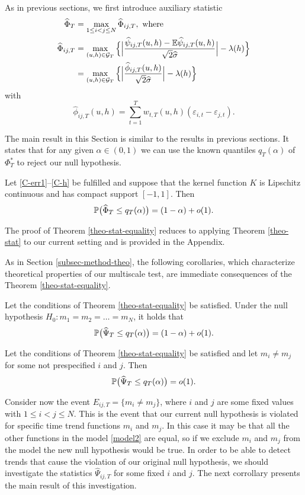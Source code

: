 \documentclass[a4paper,12pt]{article}
\numberwithin{equation}{section}
\begin{document}
As in previous sections, we first introduce auxiliary statistic 
\begin{align*}
\widehat{\Phi}_T &= \max_{1\le i < j \le N} \widehat{\Phi}_{ij, T}, \text{ where}\\
\widehat{\Phi}_{ij,T} 
 & = \max_{(u,h) \in \mathcal{G}_T} \Big\{ \Big| \frac{\widehat{\psi}_{ij,T}(u,h) - \mathbb{E} \widehat{\psi}_{ij,T}(u,h)}{\sqrt{2}\widehat{\sigma}} \Big| - \lambda(h) \Big\} \\
 & = \max_{(u,h) \in \mathcal{G}_T} \Big\{ \Big| \frac{\widehat{\phi}_{ij,T}(u,h)} {\sqrt{2}\widehat{\sigma}} \Big| - \lambda(h) \Big \}
\end{align*}
with 
\[ \widehat{\phi}_{ij,T}(u,h) = \sum\limits_{t=1}^T w_{t,T}(u,h) (\varepsilon_{i,t} - \varepsilon_{j,t}). \]


The main result in this Section is similar to the results in previous sections. It states that for any given $\alpha \in (0,1)$ we can use the known quantiles $q_T(\alpha)$ of $\Phi_T^*$ to reject our null hypothesis.
\begin{theorem}\label{theo-stat-equality}
Let \ref{C-err1}--\ref{C-h} be fulfilled and suppose that the kernel function $K$ is Lipschitz continuous and has compact support $[-1,1]$. Then 
\[ \mathbb{P} \big( \widehat{\Phi}_T \le q_T(\alpha) \big) = (1 - \alpha) + o(1). \]
\end{theorem}
The proof of Theorem \ref{theo-stat-equality} reduces to applying Theorem \ref{theo-stat} to our current setting and is provided in the Appendix.

As in Section \ref{subsec-method-theo}, the following corollaries, which characterize theoretical properties of our multiscale test, are immediate consequences of the Theorem \ref{theo-stat-equality}. 
\begin{corollary}\label{corollary-test-equality-1}
Let the conditions of Theorem \ref{theo-stat-equality} be satisfied. Under the null hypothesis $H_0: m_1 = m_2 = \ldots = m_N$, it holds that 
\[ \mathbb{P} \big( \widehat{\Psi}_T \le q_T(\alpha) \big) = (1 - \alpha) + o(1). \]
\end{corollary}
\begin{corollary}\label{corollary-test-equality-2}
Let the conditions of Theorem \ref{theo-stat-equality} be satisfied and let $m_i \ne m_j$ for some not prespecified $i$ and $j$. Then 
\[ \mathbb{P} \big( \widehat{\Psi}_T \le q_T(\alpha) \big) = o(1). \]
\end{corollary}

Consider now the event $E_{ij,T} = \{ m_i \ne m_j\}$, where $i$ and $j$ are some fixed values with $1\le i<j \le N$. This is the event that our current null hypothesis is violated for specific time trend functions $m_i$ and $m_j$. In this case it may be that all the other functions in the model \eqref{model2} are equal, so if we exclude $m_i$ and $m_j$ from the model the new null hypothesis would be true. In order to be able to detect trends that cause the violation of our original null hypothesis, we should investigate the statistics $\widehat{\Psi}_{ij,T}$ for some fixed $i$ and $j$. The next corrollary presents the main result of this investigation.
\end{document}
